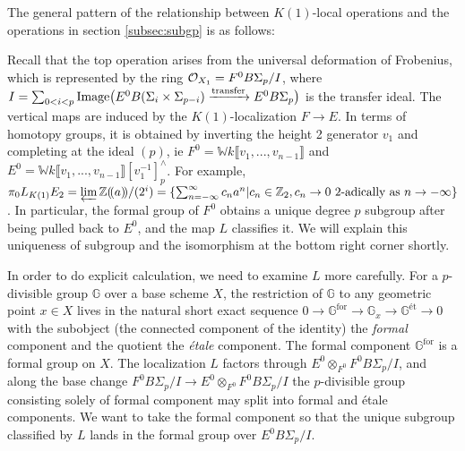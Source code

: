\documentclass{gtpart}
\theoremstyle{definition}
\theoremstyle{remark}
\newcommand{\mb}[1]{\mathbb{#1}}
\newcommand{\CO}{{\cal O}}
\begin{document}
The general pattern of the relationship between $K(1)$-local operations 
and the operations in section \ref{subsec:subgp} is as follows: 
\begin{center}
\end{center}
Recall that the top operation arises from the universal deformation 
of Frobenius, which is represented by the ring $\CO_{X_1} = F^0 B\Sigma_p/I$, 
where $I = \sum_{0<i<p} {\rm Image}\big(E^0 B(\Sigma_i\times\Sigma_{p-i}) 
\xrightarrow{\text{transfer}} E^0 B\Sigma_{p}\big)$ is 
the transfer ideal.  The vertical maps are induced by the $K(1)$-localization 
$F \to E$.  In terms of homotopy groups, it is obtained by inverting 
the height 2 generator $v_1$ and completing at the ideal $(p)$, ie 
$F^0 = {\mb W}k \llbracket v_1,...,v_{n-1} \rrbracket$ and 
$E^0 = {\mb W}k \llbracket v_1,...,v_{n-1} \rrbracket [v_1^{-1}]_p^\wedge$.  
For example, $\pi_0 L_{K(1)} E_2 = \varprojlim {\mb Z} (\!(a)\!) /(2^i) = 
\{\sum_{n = -\infty}^{\infty} c_n a^n | c_n \in {\mb Z}_2, c_n \to 0 \text{~2-adically as~} n \to -\infty\}$.  
In particular, the formal group of $F^0$ obtains a unique degree $p$ 
subgroup after being pulled back to $E^0$, and the map $L$ classifies it.  
We will explain this uniqueness of subgroup and the isomorphism at the 
bottom right corner shortly.  

In order to do explicit calculation, we need to examine $L$ more 
carefully.  For a $p$-divisible group $\mb G$ over a base scheme $X$, 
the restriction of $\mb G$ to any geometric point $x \in X$ lives in 
the natural short exact sequence 
$0 \to \mb G^{\text{for}} \to \mb G_x \to \mb G^{\text{\'et}} \to 0$ 
with the subobject (the connected component of the identity) the
{\em formal} component and the quotient the {\em \'etale} component.  The
formal component $\mb G^{\text{for}}$ is a formal group on $X$.  The localization 
$L$ factors through $E^0 \otimes_{F^0} F^0 B\Sigma_p/I$, and along the base change 
$F^0 B\Sigma_p/I \to E^0 \otimes_{F^0} F^0 B\Sigma_p/I$ the $p$-divisible 
group consisting solely of formal component may split into formal and \'etale components.  
We want to take the formal component so that the unique 
subgroup classified by $L$ lands in the formal group over $E^0 B\Sigma_p/I$.  
\end{document}
